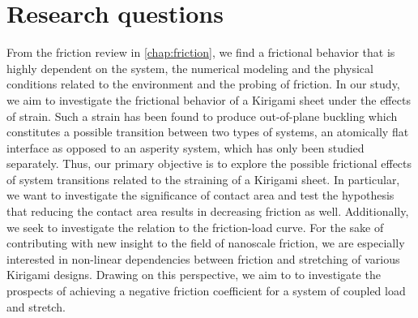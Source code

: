 



\section{Research questions}\label{sec:research_questions}
From the friction review in \cref{chap:friction}, we find a frictional
behavior that is highly dependent on the system, the numerical modeling and the
physical conditions related to the environment and the probing of friction. In our study, we aim to investigate the frictional behavior of a Kirigami sheet under the effects of strain. Such a strain has been found to produce out-of-plane buckling \cite{PhysRevLett.121.255304, PhysRevResearch.2.042006} which constitutes a possible transition between two types of systems, an atomically flat interface as opposed to an asperity system, which has only been
studied separately. Thus, our primary objective is to explore the possible frictional effects of system transitions related to the straining of a Kirigami sheet. In particular, we want to investigate the significance of contact area and test the hypothesis that reducing the contact area results in decreasing friction as well. Additionally, we seek to investigate the relation to the friction-load curve. For the sake of contributing with new insight to the field of nanoscale friction, we are especially interested in non-linear dependencies between friction and stretching of various Kirigami designs. Drawing on this perspective, we aim to to investigate the prospects of achieving a negative friction coefficient for a system of coupled load and stretch. 




